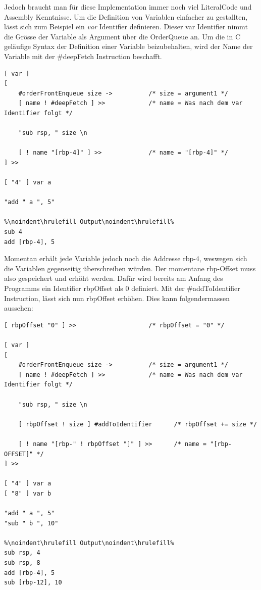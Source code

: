 Jedoch braucht man für diese Implementation immer noch viel LiteralCode und Assembly Kenntnisse. Um die Definition von Variablen einfacher zu gestallten, lässt sich zum Beispiel ein \textit{var} Identifier definieren.
Dieser var Identifier nimmt die Grösse der Variable als Argument über die OrderQueue an. Um die in C geläufige Syntax der Definition einer Variable beizubehalten,
wird der Name der Variable mit der \#deepFetch Instruction beschafft.

\begin{lstlisting}[language=QHS, caption=Definition einer Variable mit \textit{var} Identifier]
[ var ]
[
    #orderFrontEnqueue size ->          /* size = argument1 */
    [ name ! #deepFetch ] >>            /* name = Was nach dem var Identifier folgt */

    "sub rsp, " size \n

    [ ! name "[rbp-4]" ] >>             /* name = "[rbp-4]" */
] >> 

[ "4" ] var a 

"add " a ", 5"
    
%\noindent\hrulefill Output\noindent\hrulefill%
sub 4
add [rbp-4], 5
\end{lstlisting}

Momentan erhält jede Variable jedoch noch die Addresse rbp-4, weswegen sich die Variablen gegenseitig überschreiben würden. Der momentane rbp-Offset muss also gespeichert und erhöht werden.
Dafür wird bereits am Anfang des Programms ein Identifier rbpOffset als 0 definiert. Mit der \#addToIdentifier Instruction, lässt sich nun rbpOffset erhöhen. Dies kann folgendermassen aussehen:

\begin{minipage}{\linewidth}
\begin{lstlisting}[language=QHS, label=eg:qhs-vardefinition, caption=Definition einer Variable mit rbpOffset]
[ rbpOffset "0" ] >>                    /* rbpOffset = "0" */

[ var ]
[
    #orderFrontEnqueue size ->          /* size = argument1 */
    [ name ! #deepFetch ] >>            /* name = Was nach dem var Identifier folgt */

    "sub rsp, " size \n

    [ rbpOffset ! size ] #addToIdentifier      /* rbpOffset += size */

    [ ! name "[rbp-" ! rbpOffset "]" ] >>      /* name = "[rbp-OFFSET]" */
] >> 

[ "4" ] var a 
[ "8" ] var b 

"add " a ", 5"
"sub " b ", 10"
    
%\noindent\hrulefill Output\noindent\hrulefill%
sub rsp, 4
sub rsp, 8
add [rbp-4], 5
sub [rbp-12], 10
\end{lstlisting}
\end{minipage}

